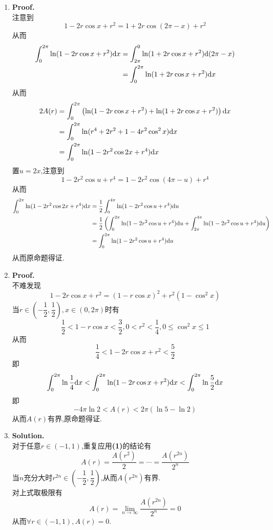 \documentclass{ctexart}
\begin{document}
\begin{solution}[Solution]
    \begin{enumerate}[label=\textbf{(\arabic*)},leftmargin=*]
        \item \textbf{Proof.}\\
            注意到$$1-2r\cos x+r^2=1+2r\cos(2\pi-x)+r^2$$
            从而
            $$\begin{aligned}
                \int_0^{2\pi}\ln(1-2r\cos x+r^2)\mathrm{d} x
                &= \int_{2\pi}^{0}\ln(1+2r\cos x+r^2)\mathrm{d} (2\pi-x) \\
                &= \int_0^{2\pi}\ln(1+2r\cos x+r^2)\mathrm{d} x
            \end{aligned}$$
            从而
            $$\begin{aligned}
                2A(r)
                &= \int_{0}^{2\pi}\left(\ln(1-2r\cos x+r^2)+\ln(1+2r\cos x+r^2)\right)\mathrm{d} x \\
                &= \int_{0}^{2\pi}\ln(r^4+2r^2+1-4r^2\cos^2x)\mathrm{d} x \\
                &= \int_{0}^{2\pi}\ln(1-2r^2\cos 2x+r^4)\mathrm{d} x \\
            \end{aligned}$$
            置$u=2x$,注意到$$1-2r^2\cos u+r^4=1-2r^2\cos (4\pi-u)+r^4$$
            从而
            $$\begin{aligned}
                \int_{0}^{2\pi}\ln(1-2r^2\cos 2x+r^4)\mathrm{d} x
                &= \dfrac{1}{2}\int_{0}^{4\pi}\ln(1-2r^2\cos u+r^4)\mathrm{d} u \\
                &= \dfrac{1}{2}\left(\int_{0}^{2\pi}\ln(1-2r^2\cos u+r^4)\mathrm{d} u+\int_{2\pi}^{4\pi}\ln(1-2r^2\cos u+r^4)\mathrm{d} u\right) \\
                &= \int_{0}^{2\pi}\ln(1-2r^2\cos u+r^4)\mathrm{d} u
            \end{aligned}$$
            从而原命题得证.
        \item \textbf{Proof.}\\
            不难发现$$1-2r\cos x+r^2=(1-r\cos x)^2+r^2(1-\cos^2 x)$$
            当$r\in\left(-\dfrac{1}{2},\dfrac{1}{2}\right),x\in(0,2\pi)$时有
            $$\dfrac{1}{2}<1-r\cos x<\dfrac{3}{2},0<r^2<\dfrac{1}{4},0\leqslant\cos^2x\leqslant 1$$
            从而$$\dfrac{1}{4}<1-2r\cos x+r^2<\dfrac{5}{2}$$
            即$$\int_0^{2\pi}\ln\dfrac{1}{4}\mathrm{d} x<\int_0^{2\pi}\ln(1-2r\cos x+r^2)\mathrm{d} x<\int_0^{2\pi}\ln\dfrac{5}{2}\mathrm{d} x$$
            即$$-4\pi\ln2<A(r)<2\pi(\ln5-\ln2)$$
            从而$A(r)$有界,原命题得证.
        \item \textbf{Solution.}\\
            对于任意$r\in(-1,1)$,重复应用\textbf{(1)}的结论有
            $$A(r)=\dfrac{A\left(r^2\right)}{2}=\cdots=\dfrac{A\left(r^{2n}\right)}{2^n}$$
            当$n$充分大时$r^{2n}\in\left(-\dfrac{1}{2},\dfrac{1}{2}\right)$,从而$A\left(r^{2n}\right)$有界.\\
            对上式取极限有$$A(r)=\lim_{n\to\infty}\dfrac{A\left(r^{2n}\right)}{2^n}=0$$
            从而$\forall r\in(-1,1),A(r)=0$.
    \end{enumerate}
\end{solution}
\end{document}
